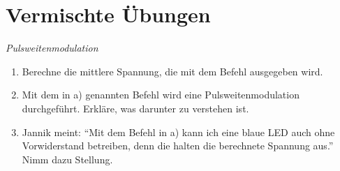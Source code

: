 \newpage
\section{Vermischte Übungen}

\begin{aufgabe} \emph{Pulsweitenmodulation}
	
	\begin{enumerate}[label=\alph*), itemsep=0mm,parsep=0mm]
		\item Berechne die mittlere Spannung, die mit dem Befehl  ausgegeben wird.
		\item Mit dem in a) genannten Befehl wird eine Pulsweitenmodulation durchgeführt. Erkläre, was darunter zu verstehen ist.
		\item Jannik meint: \enquote{Mit dem Befehl in a) kann ich eine blaue LED auch ohne Vorwiderstand betreiben, denn die halten die berechnete Spannung aus.} Nimm dazu Stellung.
	\end{enumerate}
\end{aufgabe}


